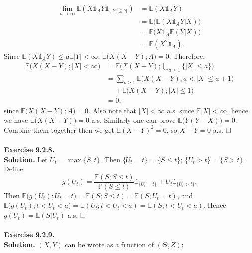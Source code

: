 \documentclass[12pt]{extarticle}
\begin{document}
\begin{equation*}
\begin{aligned}
\lim_{b\rightarrow\infty}\mathbb{E}(X\mathds{1}_AY\mathds{1}_{\{|Y|\leq b\}}) &= \mathbb{E}(X\mathds{1}_AY) \\&
=\mathbb{E}\big(\mathbb{E}(X\mathds{1}_AY|X)\big) \\&
=\mathbb{E}\big(X\mathds{1}_A\mathbb{E}(Y|X)\big) \\&
=\mathbb{E}(X^2\mathds{1}_A).
\end{aligned}
\end{equation*}
Since $\mathbb{E}(X\mathds{1}_AY)\leq a\mathbb{E}|Y|<\infty$, $\mathbb{E}\big(X(X-Y);A\big)=0.$ Therefore,
\begin{equation*}
\begin{aligned}
\mathbb{E}\big(X(X-Y);|X|<\infty\big) &= \mathbb{E}\Big(X(X-Y);\bigcup_{a\geq 1}\{|X|\leq a\}\Big) \\&
=\sum_{a\geq 1}\mathbb{E}\big(X(X-Y); a<|X|\leq a+1\big) \\&\;\;\;\;
+\mathbb{E}\big(X(X-Y);|X|\leq 1\big) \\&
=0,
\end{aligned}
\end{equation*}
since $\mathbb{E}\big(X(X-Y);A\big)=0$. Also note that $|X|<\infty$ a.s. since $\mathbb{E}|X|<\infty$, hence we have $\mathbb{E}\big(X(X-Y)\big)=0$ a.s. Similarly one can prove $\mathbb{E}\big(Y(Y-X)\big)=0$. Combine them together then we get $\mathbb{E}(X-Y)^2=0$, so $X-Y=0$ a.s.
$\hspace{\fill}\square$
\\ \\
\textbf{Exercise 9.2.8.}\\
\textbf{Solution.} Let $U_t=\max\{S,t\}$. Then $\{U_t=t\}=\{S\leq t\}$; $\{U_t>t\}=\{S>t\}$. Define
\begin{equation*}
g(U_t)=\frac{\mathbb{E}(S;S\leq t)}{\mathbb{P}(S\leq t)}\mathds{1}_{\{U_t=t\}}+U_t\mathds{1}_{\{U_t>t\}}.
\end{equation*}
Then $\mathbb{E}\big(g(U_t); U_t=t\big)=\mathbb{E}(S;S\leq t)=\mathbb{E}(S;U_t=t)$, and $\mathbb{E}\big(g(U_t); t<U_t<a\big)=\mathbb{E}(U_t;t<U_t<a)=\mathbb{E}(S;t<U_t<a)$. Hence $g(U_t)=\mathbb{E}(S|U_t)$ a.s.
$\hspace{\fill}\square$
\\ \\
\textbf{Exercise 9.2.9.}\\
\textbf{Solution.} $(X,Y)$ can be wrote as a function of $(\Theta,Z)$:
\end{document}
